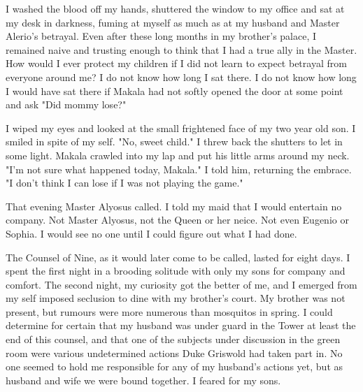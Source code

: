 \documentclass{article}
\begin{document}
I washed the blood off my hands, shuttered the window to my office and sat at my desk in darkness, fuming at myself as much as at my husband and Master Alerio's betrayal. Even after these long months in my brother's palace, I remained naive and trusting enough to think that I had a true ally in the Master. How would I ever protect my children if I did not learn to expect betrayal from everyone around me? I do not know how long I sat there. I do not know how long I would have sat there if Makala had not softly opened the door at some point and ask "Did mommy lose?"

I wiped my eyes and looked at the small frightened face of my two year old son. I smiled in spite of my self. "No, sweet child." I threw back the shutters to let in some light. Makala crawled into my lap and put his little arms around my neck. "I'm not sure what happened today, Makala." I told him, returning the embrace. "I don't think I can lose if I was not playing the game."

\vspace{.5cm}

That evening Master Alyosus called. I told my maid that I would entertain no company. Not Master Alyosus, not the Queen or her neice. Not even Eugenio or Sophia. I would see no one until I could figure out what I had done. 

The Counsel of Nine, as it would later come to be called, lasted for eight days. I spent the first night in a brooding solitude with only my sons for company and comfort. The second night, my curiosity got the better of me, and I emerged from my self imposed seclusion to dine with my brother's court. My brother was not present, but rumours were more numerous than mosquitos in spring. I could determine for certain that my husband was under guard in the Tower at least the end of this counsel, and that one of the subjects under discussion in the green room were various undetermined actions Duke Griswold had taken part in. No one seemed to hold me responsible for any of my husband's actions yet, but as husband and wife we were bound together. I feared for my sons. 
\end{document}
